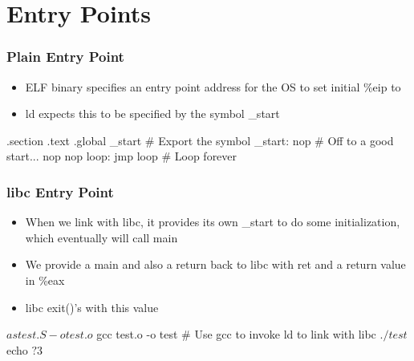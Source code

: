 \documentclass[11pt,xcolor=dvipsnames]{beamer}
\newcommand{\mvs}{\vspace{-0.95em}}
\begin{document}
\section{Entry Points}

\begin{frame}[fragile,t]
\frametitle{Plain Entry Point}
\begin{itemize}
  \item ELF binary specifies an entry point address for the OS to set initial {\ttfamily \%eip} to
  \item {\ttfamily ld} expects this to be specified by the symbol {\ttfamily \_start}
\end{itemize}
\begin{gascode}
.section .text
.global _start    # Export the symbol
_start:
  nop             # Off to a good start...
  nop
  nop
  loop: jmp loop  # Loop forever
\end{gascode}
\end{frame}

\begin{frame}[fragile,t]
\frametitle{{\ttfamily libc} Entry Point}
\mvs
\begin{itemize}
  \item When we link with {\ttfamily libc}, it provides its own {\ttfamily \_start} to do some initialization, which eventually will call {\ttfamily main}
  \item We provide a {\ttfamily main} and also a return back to libc with {\ttfamily ret} and a return value in {\ttfamily \%eax}
  \item libc {\ttfamily exit()'s} with this value
\end{itemize}
\begin{textcode}
$ as test.S -o test.o
$ gcc test.o -o test    # Use gcc to invoke ld to link with libc
$ ./test
$ echo $?
3
$
\end{textcode}
\end{frame}
\end{document}
